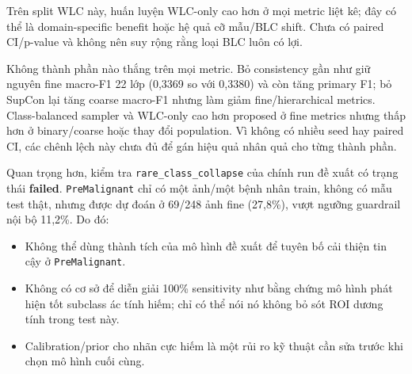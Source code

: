 \documentclass[
  10pt,
  a4paper,
  twocolumn]{article}
\providecommand{\tightlist}{%
  \setlength{\itemsep}{0pt}\setlength{\parskip}{0pt}}
\begin{document}
\begin{table}[htbp]
\centering
\caption{So sánh hiệu năng khi huấn luyện và đánh giá trên miền WLC.}
\label{tab:table15}
\vspace{2pt}
\end{table}

Trên split WLC này, huấn luyện WLC-only cao hơn ở mọi metric liệt kê;
đây có thể là domain-specific benefit hoặc hệ quả cỡ mẫu/BLC shift. Chưa
có paired CI/p-value và không nên suy rộng rằng loại BLC luôn có lợi.

Không thành phần nào thắng trên mọi metric. Bỏ consistency gần như giữ
nguyên fine macro-F1 22 lớp (0,3369 so với 0,3380) và còn tăng primary
F1; bỏ SupCon lại tăng coarse macro-F1 nhưng làm giảm fine/hierarchical
metrics. Class-balanced sampler và WLC-only cao hơn proposed ở fine
metrics nhưng thấp hơn ở binary/coarse hoặc thay đổi population. Vì
không có nhiều seed hay paired CI, các chênh lệch này chưa đủ để gán
hiệu quả nhân quả cho từng thành phần.

Quan trọng hơn, kiểm tra \texttt{rare\_class\_collapse} của chính run đề
xuất có trạng thái \textbf{failed}. \texttt{PreMalignant} chỉ có một
ảnh/một bệnh nhân train, không có mẫu test thật, nhưng được dự đoán ở
69/248 ảnh fine (27,8\%), vượt ngưỡng guardrail nội bộ 11,2\%. Do đó:

\begin{itemize}
\tightlist
\item
  Không thể dùng thành tích của mô hình đề xuất để tuyên bố cải thiện
  tin cậy ở \texttt{PreMalignant}.
\item
  Không có cơ sở để diễn giải 100\% sensitivity như bằng chứng mô hình
  phát hiện tốt subclass ác tính hiếm; chỉ có thể nói nó không bỏ sót
  ROI dương tính trong test này.
\item
  Calibration/prior cho nhãn cực hiếm là một rủi ro kỹ thuật cần sửa
  trước khi chọn mô hình cuối cùng.
\end{itemize}
\end{document}

